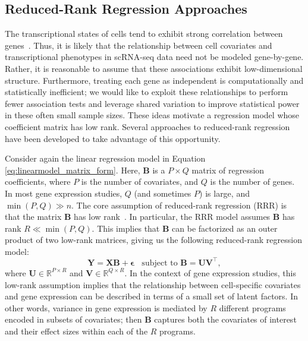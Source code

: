 \documentclass{bmcart}
\begin{document}
\subsection*{Reduced-Rank Regression Approaches}
The transcriptional states of cells tend to exhibit strong correlation between genes~\citep{stuart2003gene}. Thus, it is likely that the relationship between cell covariates and transcriptional phenotypes in scRNA-seq data need not be modeled gene-by-gene. Rather, it is reasonable to assume that these associations exhibit low-dimensional structure. Furthermore, treating each gene as independent is computationally and statistically inefficient; we would like to exploit these relationships to perform fewer association tests and leverage shared variation to improve statistical power in these often small sample sizes. These ideas motivate a regression model whose coefficient matrix has low rank. Several approaches to reduced-rank regression have been developed to take advantage of this opportunity.

Consider again the linear regression model in Equation \eqref{eq:linearmodel_matrix_form}. Here, $\mathbf{B}$ is a $P\times Q$ matrix of regression coefficients, where $P$ is the number of covariates, and $Q$ is the number of genes. In most gene expression studies, $Q$ (and sometimes $P$) is large, and $\min(P, Q) \gg n$. The core assumption of reduced-rank regression (RRR) is that the matrix $\mathbf{B}$ has low rank~\citep{anderson1951estimating}. In particular, the RRR model assumes $\mathbf{B}$ has rank $R \ll \min(P, Q)$. This implies that $\mathbf{B}$ can be factorized as an outer product of two low-rank matrices, giving us the following reduced-rank regression model:
\begin{equation}
    \mathbf{Y} = \mathbf{X} \mathbf{B} + \boldsymbol{\epsilon}~~~~\text{subject to } \mathbf{B} = \mathbf{U} \mathbf{V}^\top, \label{eq:rrr_model}
\end{equation}
where $\mathbf{U} \in \mathbb{R}^{P \times R}$ and $\mathbf{V} \in \mathbb{R}^{Q \times R}$. In the context of gene expression studies, this low-rank assumption implies that the relationship between cell-specific covariates and gene expression can be described in terms of a small set of latent factors. In other words, variance in gene expression is mediated by $R$ different programs encoded in subsets of covariates; then $\mathbf{B}$ captures both the covariates of interest and their effect sizes within each of the $R$ programs.
\end{document}
